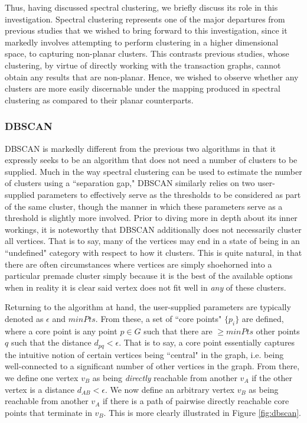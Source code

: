 \documentclass{article}
\begin{document}
Thus, having discussed spectral clustering, we briefly discuss its role in this investigation. Spectral clustering represents one of the major departures from previous studies that we wished to bring forward to this investigation, since it markedly involves attempting to perform clustering in a higher dimensional space, to capturing non-planar clusters. This contrasts previous studies, whose clustering, by virtue of directly working with the transaction graphs, cannot obtain any results that are non-planar. Hence, we wished to observe whether any clusters are more easily discernable under the mapping produced in spectral clustering as compared to their planar counterparts.

\subsubsection{DBSCAN}
DBSCAN is markedly different from the previous two algorithms in that it expressly seeks to be an algorithm that does not need a number of clusters to be supplied. Much in the way spectral clustering can be used to estimate the number of clusters using a ``separation gap," DBSCAN similarly relies on two user-supplied parameters to effectively serve as the thresholds to be considered as part of the same cluster, though the manner in which these parameters serve as a threshold is slightly more involved. Prior to diving more in depth about its inner workings, it is noteworthy that DBSCAN additionally does not necessarily cluster all vertices. That is to say, many of the vertices may end in a state of being in an ``undefined" category with respect to how it clusters. This is quite natural, in that there are often circumstances where vertices are simply shoehorned into a particular premade cluster simply because it is the best of the available options when in reality it is clear said vertex does not fit well in \textit{any} of these clusters.

Returning to the algorithm at hand, the user-supplied parameters are typically denoted as $\epsilon$ and $minPts$. From these, a set of ``core points" $\{p_i\}$ are defined, where a core point is any point $p\in G$ such that there are $\ge minPts$ other points $q$ such that the distance $d_{pq} < \epsilon$. That is to say, a core point essentially captures the intuitive notion of certain vertices being ``central" in the graph, i.e. being well-connected to a significant number of other vertices in the graph. From there, we define one vertex $v_B$ as being \textit{directly} reachable from another $v_A$ if the other vertex is a distance $d_{AB} < \epsilon$. We now define an arbitrary vertex $v_B$ as being reachable from another $v_A$ if there is a path of pairwise directly reachable core points that terminate in $v_B$. This is more clearly illustrated in Figure \ref{fig:dbscan}.
\end{document}
